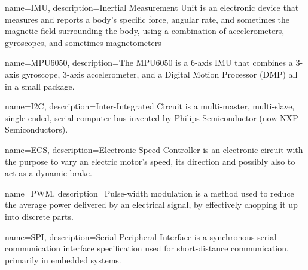 {
	name=IMU,
	description={Inertial Measurement Unit is an electronic device that measures and reports a body's specific force, angular rate, and sometimes the magnetic field surrounding the body, using a combination of accelerometers, gyroscopes, and sometimes magnetometers}
}

{
	name=MPU6050,
	description={The MPU6050 is a 6-axis IMU that combines a 3-axis gyroscope, 3-axis accelerometer, and a Digital Motion Processor (DMP) all in a small package.}
}

{
	name=I2C,
	description={Inter-Integrated Circuit is a multi-master, multi-slave, single-ended, serial computer bus invented by Philips Semiconductor (now NXP Semiconductors).}
}

{
	name=ECS,
	description={Electronic Speed Controller is an electronic circuit with the purpose to vary an electric motor's speed, its direction and possibly also to act as a dynamic brake.}
}

{
	name=PWM,
	description={Pulse-width modulation is a method used to reduce the average power delivered by an electrical signal, by effectively chopping it up into discrete parts.}
}

{
	name=SPI,
	description={Serial Peripheral Interface is a synchronous serial communication interface specification used for short-distance communication, primarily in embedded systems.}
}
